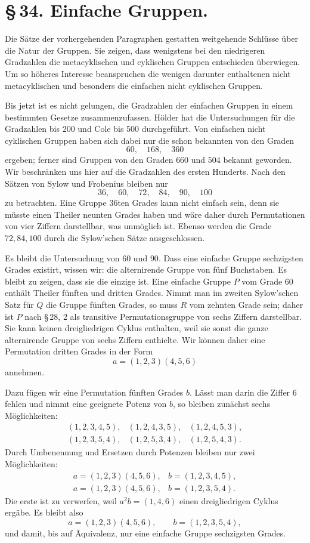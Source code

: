 \documentclass[11pt]{article}
\begin{document}
\section*{\S\,34. Einfache Gruppen.}

Die Sätze der vorhergehenden Paragraphen gestatten weitgehende Schlüsse über die Natur der Gruppen. Sie zeigen, dass wenigstens bei den niedrigeren Gradzahlen die metacyklischen und cyklischen Gruppen entschieden überwiegen. Um so höheres Interesse beanspruchen die wenigen darunter enthaltenen nicht metacyklischen und besonders die einfachen nicht cyklischen Gruppen.

Bis jetzt ist es nicht gelungen, die Gradzahlen der einfachen Gruppen in einem bestimmten Gesetze zusammenzufassen. Hölder hat die Untersuchungen für die Gradzahlen bis 200 und Cole bis 500 durchgeführt. Von einfachen nicht cyklischen Gruppen haben sich dabei nur die schon bekannten von den Graden
\[
60,\quad 168,\quad 360
\]
ergeben; ferner sind Gruppen von den Graden $660$ und $504$ bekannt geworden. Wir beschränken uns hier auf die Gradzahlen des ersten Hunderts. Nach den Sätzen von Sylow und Frobenius bleiben nur
\[
36,\quad 60,\quad 72,\quad 84,\quad 90,\quad 100
\]
zu betrachten. Eine Gruppe 36ten Grades kann nicht einfach sein, denn sie müsste einen Theiler neunten Grades haben und wäre daher durch Permutationen von vier Ziffern darstellbar, was unmöglich ist. Ebenso werden die Grade $72,84,100$ durch die Sylow'schen Sätze ausgeschlossen.

Es bleibt die Untersuchung von $60$ und $90$. Dass eine einfache Gruppe sechzigsten Grades existirt, wissen wir: die alternirende Gruppe von fünf Buchstaben. Es bleibt zu zeigen, dass sie die einzige ist. Eine einfache Gruppe $P$ vom Grade $60$ enthält Theiler fünften und dritten Grades. Nimmt man im zweiten Sylow'schen Satz für $Q$ die Gruppe fünften Grades, so muss $R$ vom zehnten Grade sein; daher ist $P$ nach \S\,28, 2 als transitive Permutationsgruppe von sechs Ziffern darstellbar. Sie kann keinen dreigliedrigen Cyklus enthalten, weil sie sonst die ganze alternirende Gruppe von sechs Ziffern enthielte. Wir können daher eine Permutation dritten Grades in der Form
\[
a=(1,2,3)(4,5,6)
\]
annehmen.

Dazu fügen wir eine Permutation fünften Grades $b$. Lässt man darin die Ziffer $6$ fehlen und nimmt eine geeignete Potenz von $b$, so bleiben zunächst sechs Möglichkeiten:
\[
\begin{array}{lll}
(1,2,3,4,5),&(1,2,4,3,5),&(1,2,4,5,3),\\
(1,2,3,5,4),&(1,2,5,3,4),&(1,2,5,4,3).
\end{array}
\]
Durch Umbenennung und Ersetzen durch Potenzen bleiben nur zwei Möglichkeiten:
\[
\begin{array}{ll}
a=(1,2,3)(4,5,6),& b=(1,2,3,4,5),\\
a=(1,2,3)(4,5,6),& b=(1,2,3,5,4).
\end{array}
\]
Die erste ist zu verwerfen, weil $a^2b=(1,4,6)$ einen dreigliedrigen Cyklus ergäbe. Es bleibt also
\[
a=(1,2,3)(4,5,6),\qquad b=(1,2,3,5,4),
\]
und damit, bis auf Äquivalenz, nur eine einfache Gruppe sechzigsten Grades.
\end{document}
